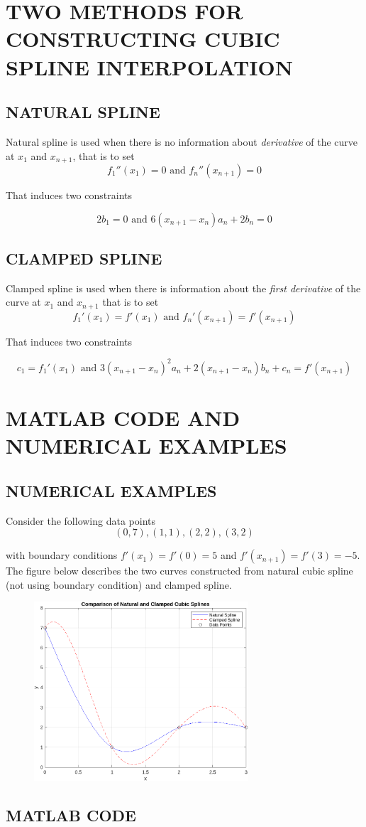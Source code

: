 \section{TWO METHODS FOR CONSTRUCTING CUBIC SPLINE INTERPOLATION}

\subsection{NATURAL SPLINE}

Natural spline is used when there is no information about \textit{derivative} of the curve at $x_1$ and $x_{n+1}$, that is to set
$$
	f_1''(x_1) = 0 \text{ and } f_n''(x_{n+1}) = 0
$$

That induces two constraints

$$
	2 b_1 = 0 \text{ and } 6(x_{n+1} - x_n) a_n + 2 b_n = 0
$$

\subsection{CLAMPED SPLINE}

Clamped spline is used when there is information about the \textit{first derivative} of the curve at $x_1$ and $x_{n+1}$
that is to set
$$
	f_1'(x_1) = f'(x_1) \text{ and } f_n'(x_{n+1}) = f'(x_{n+1})
$$

That induces two constraints

$$
	c_1 = f_1'(x_1) \text{ and } 3 (x_{n+1} - x_n)^2 a_n + 2 (x_{n+1} - x_n) b_n + c_n =  f'(x_{n+1})
$$


\section{MATLAB CODE AND NUMERICAL EXAMPLES}

\subsection{NUMERICAL EXAMPLES}

Consider the following data points
$$
	(0, 7), (1, 1), (2, 2), (3, 2)
$$

with boundary conditions $f'(x_1) = f'(0) = 5$ and $f'(x_{n+1}) = f'(3) = -5$. The figure below describes the two curves constructed from natural cubic spline (not using boundary condition) and clamped spline.

\begin{figure}[H]
	\begin{center}
		\includegraphics[width=8cm]{ma5271.png}
	\end{center}
\end{figure}


\subsection{MATLAB CODE}




